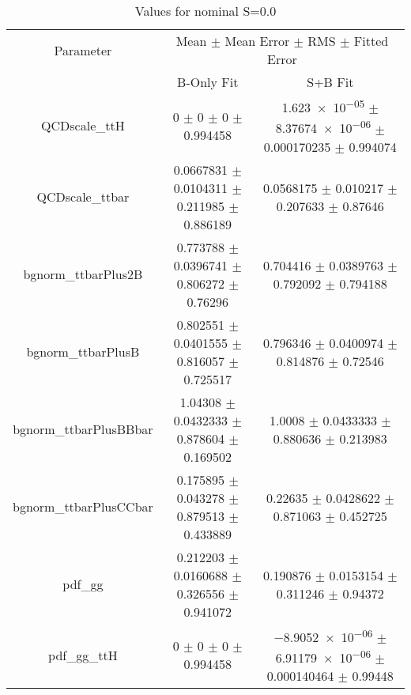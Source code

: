 \begin{table}
\centering
\caption{Values for nominal S=0.0}
\begin{tabular}{ccc}
\toprule
Parameter & \multicolumn{2}{c}{Mean $\pm$ Mean Error $\pm$ RMS $\pm$ Fitted Error}\\
 & B-Only Fit & S+B Fit\\
\midrule
QCDscale\_ttH & \num{0} $\pm$ \num{0} $\pm$ \num{0} $\pm$ \num{0.994458} & \num{1.623e-05} $\pm$ \num{8.37674e-06} $\pm$ \num{0.000170235} $\pm$ \num{0.994074}\\
QCDscale\_ttbar & \num{0.0667831} $\pm$ \num{0.0104311} $\pm$ \num{0.211985} $\pm$ \num{0.886189} & \num{0.0568175} $\pm$ \num{0.010217} $\pm$ \num{0.207633} $\pm$ \num{0.87646}\\
bgnorm\_ttbarPlus2B & \num{0.773788} $\pm$ \num{0.0396741} $\pm$ \num{0.806272} $\pm$ \num{0.76296} & \num{0.704416} $\pm$ \num{0.0389763} $\pm$ \num{0.792092} $\pm$ \num{0.794188}\\
bgnorm\_ttbarPlusB & \num{0.802551} $\pm$ \num{0.0401555} $\pm$ \num{0.816057} $\pm$ \num{0.725517} & \num{0.796346} $\pm$ \num{0.0400974} $\pm$ \num{0.814876} $\pm$ \num{0.72546}\\
bgnorm\_ttbarPlusBBbar & \num{1.04308} $\pm$ \num{0.0432333} $\pm$ \num{0.878604} $\pm$ \num{0.169502} & \num{1.0008} $\pm$ \num{0.0433333} $\pm$ \num{0.880636} $\pm$ \num{0.213983}\\
bgnorm\_ttbarPlusCCbar & \num{0.175895} $\pm$ \num{0.043278} $\pm$ \num{0.879513} $\pm$ \num{0.433889} & \num{0.22635} $\pm$ \num{0.0428622} $\pm$ \num{0.871063} $\pm$ \num{0.452725}\\
pdf\_gg & \num{0.212203} $\pm$ \num{0.0160688} $\pm$ \num{0.326556} $\pm$ \num{0.941072} & \num{0.190876} $\pm$ \num{0.0153154} $\pm$ \num{0.311246} $\pm$ \num{0.94372}\\
pdf\_gg\_ttH & \num{0} $\pm$ \num{0} $\pm$ \num{0} $\pm$ \num{0.994458} & \num{-8.9052e-06} $\pm$ \num{6.91179e-06} $\pm$ \num{0.000140464} $\pm$ \num{0.99448}\\
\bottomrule
\end{tabular}
\end{table}